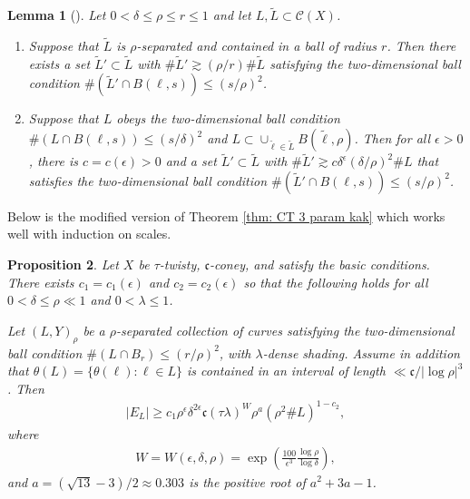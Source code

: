 \documentclass[12pt]{amsart}
\numberwithin{equation}{section}
\newtheorem{lemma}{Lemma}[section]
\newtheorem{proposition}[lemma]{Proposition}
\newcommand{\1}{\mathbbm{1}}
\begin{document}
\begin{lemma}[]\label{lem: 2 dim cond refinement}
    Let $0 < \delta \leq \rho \leq r \leq 1$ and let $L, \tilde L \subset \mathcal C(X)$. 
    \begin{enumerate}
        \item Suppose that $\tilde L$ is $\rho$-separated and contained in a ball of radius $r$. Then there exists a set $\tilde L' \subset \tilde L$ with $\# \tilde L' \gtrsim (\rho /r) \# \tilde L$ satisfying the two-dimensional ball condition $\# (\tilde L' \cap B(\ell, s)) \leq (s / \rho)^2$. 
        \item Suppose that $L$ obeys the two-dimensional ball condition $\#(L \cap B(\ell, s)) \leq (s / \delta)^2$ and $L \subset \cup_{\tilde \ell \in \tilde L} B(\tilde \ell, \rho)$. Then for all $\epsilon > 0$, there is $c = c(\epsilon) > 0$ and a set $\tilde L' \subset \tilde L$ with $\# \tilde L' \gtrsim c\delta^\epsilon (\delta / \rho)^2 \# L$ that satisfies the two-dimensional ball condition $\#(\tilde L' \cap B(\ell, s)) \leq (s/\rho)^2$. 
    \end{enumerate}
\end{lemma}

Below is the modified version of Theorem \ref{thm: CT 3 param kak} which works well with induction on scales. 
\begin{proposition}\label{prop: inductive CT 3 param kak}
    Let $X$ be $\tau$-twisty, $\mathfrak c$-coney, and satisfy the basic conditions.  
    There exists $c_1 = c_1(\epsilon)$
    and $c_2 = c_2(\epsilon)$ so that the following holds for all $0 < \delta \leq \rho \ll 1$ and $0 < \lambda \leq 1$. 

    Let $(L,Y)_\rho$ be a $\rho$-separated collection of curves satisfying the two-dimensional ball condition $\#(L \cap B_r) \leq (r / \rho)^2$, with $\lambda$-dense shading. Assume in addition that $\theta(L) = \{\theta(\ell) : \ell \in L\}$ is contained in an interval of length $\ll \mathfrak c/|\log \rho|^{3}$. Then  
    \begin{align}\label{eq: induct bound}
        |E_L| \geq c_1 \rho^\epsilon \delta^{2\epsilon} \mathfrak c (\tau \lambda)^W \rho^a (\rho^2 \# L)^{1-c_2},  
    \end{align}
    where 
    \begin{align}
        W = W(\epsilon, \delta, \rho) = \exp(\frac{100}{\epsilon^3} \frac{\log \rho}{\log \delta}),
    \end{align}
    and $a = (\sqrt{13} - 3)/2 \approx 0.303$ is the positive root of $a^2 + 3a - 1$.
\end{proposition}
\end{document}
